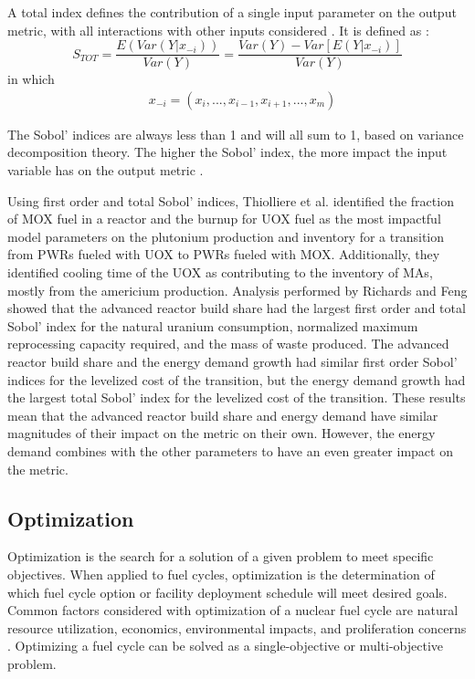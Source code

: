 \noindent A total index defines the contribution of a
single input parameter on the output metric, with all interactions with other 
inputs considered \cite{adams_dakota_2021}. It is defined as 
\cite{adams_dakota_2021}:
\begin{equation}
    S_{TOT} = \frac{E(Var(Y|x_{-i}))}{Var(Y)} = \frac{Var(Y) - Var[E(Y|x_{-i})]}{Var(Y)}
\end{equation}
in which 
\begin{align*}
    &x_{-i} = (x_i,...,x_{i-1}, x_{i+1},...,x_m)
\end{align*}

\noindent The Sobol' indices are always less than 1 and will all sum to 1, 
based
on variance decomposition theory. The higher the Sobol' index, the more 
impact the input variable has on the output metric 
\cite{thiolliere_methodology_2018}.

Using first order and total Sobol' indices, Thiolliere et al.
\cite{thiolliere_methodology_2018} identified 
the fraction of \gls{MOX} fuel in a reactor 
and the burnup for \gls{UOX} fuel as the most impactful model parameters on 
the plutonium production and inventory
for a transition from \glspl{PWR} fueled with \gls{UOX} to \glspl{PWR} 
fueled with \gls{MOX}. 
Additionally, they identified cooling time of the \gls{UOX} as contributing 
to the inventory of \glspl{MA}, mostly from the 
americium production. Analysis performed by Richards and Feng
\cite{richards_application_2021}
showed that the advanced reactor build share had the largest first 
order and total Sobol' index for the natural uranium consumption, 
normalized 
maximum reprocessing capacity required, and the mass of waste produced. The 
advanced reactor build share and the energy demand growth had similar first 
order Sobol' indices for the levelized cost of the transition, but the 
energy demand growth had the largest total Sobol' index for the levelized 
cost of the transition. These results mean that the advanced reactor 
build share and energy demand have similar magnitudes of their impact 
on the metric on their own. However, the energy demand combines with 
the other parameters to have an even greater impact on the metric. 

\subsection{Optimization}
Optimization is the search for a solution of a given problem to 
meet specific objectives. When applied to fuel cycles, optimization 
is the determination of which fuel cycle option or facility 
deployment schedule will meet desired goals. Common factors 
considered with optimization of a nuclear fuel cycle are natural 
resource utilization, economics, environmental impacts, and proliferation 
concerns \cite{passerini_systematic_2014,wigeland_nuclear_2014}. Optimizing 
a fuel cycle can be solved as a single-objective or multi-objective 
problem. 

